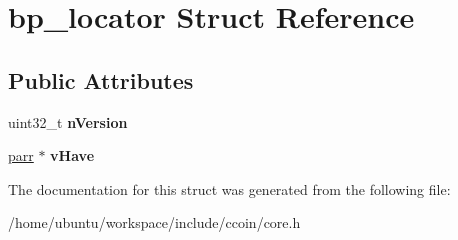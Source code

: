 \hypertarget{structbp__locator}{\section{bp\-\_\-locator Struct Reference}
\label{structbp__locator}
}
\subsection*{Public Attributes}
\begin{DoxyCompactItemize}
\item 
\hypertarget{structbp__locator_aaab01f12efcfb8ba39b8c3813beac407}{uint32\-\_\-t {\bfseries n\-Version}}\label{structbp__locator_aaab01f12efcfb8ba39b8c3813beac407}

\item 
\hypertarget{structbp__locator_aa3beca7a93a6b37e8f011323acc90344}{\hyperlink{structparr}{parr} $\ast$ {\bfseries v\-Have}}\label{structbp__locator_aa3beca7a93a6b37e8f011323acc90344}

\end{DoxyCompactItemize}


The documentation for this struct was generated from the following file\-:\begin{DoxyCompactItemize}
\item 
/home/ubuntu/workspace/include/ccoin/core.\-h\end{DoxyCompactItemize}
